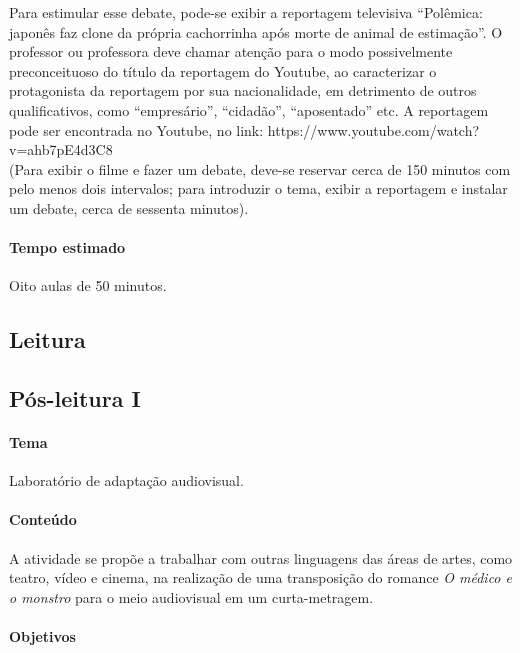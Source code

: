 \documentclass[12pt]{extarticle}
\begin{document}
{Para estimular esse debate, pode-se exibir a reportagem televisiva
``Polêmica: japonês faz clone da própria cachorrinha após morte de
animal de estimação''. O professor ou professora deve chamar atenção
para o modo possivelmente preconceituoso do título da reportagem do
Youtube, ao caracterizar o protagonista da reportagem por sua
nacionalidade, em detrimento de outros qualificativos, como
``empresário'', ``cidadão'', ``aposentado'' etc. A reportagem pode ser
encontrada no Youtube, no link:
https://www.youtube.com/watch?v=ahb7pE4d3C8\\
(Para exibir o filme e fazer um debate, deve-se reservar cerca de 150
minutos com pelo menos dois intervalos; para introduzir o tema, exibir a
reportagem e instalar um debate, cerca de sessenta minutos).

\paragraph{Tempo estimado} Oito aulas de 50 minutos.

\subsection{Leitura}

\subsection{Pós-leitura I}

\paragraph{Tema} Laboratório de adaptação audiovisual.


\paragraph{Conteúdo}
A atividade se propõe a trabalhar com outras linguagens das áreas de
artes, como teatro, vídeo e cinema, na realização de uma transposição do
romance \emph{O médico e o monstro} para o meio audiovisual em um
curta-metragem.

\paragraph{Objetivos}

}
\end{document}
